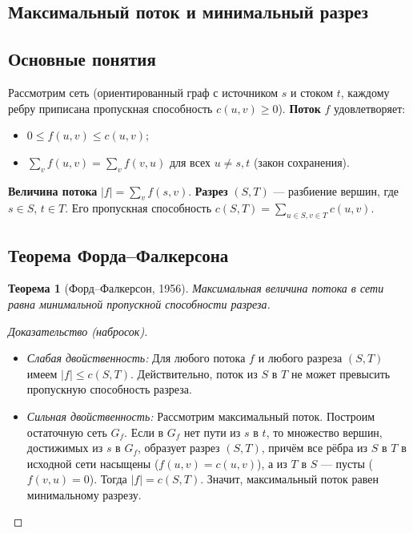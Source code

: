 \documentclass[12pt]{article}
\newtheorem{theorem}{Теорема}
\begin{document}
\begin{enumerate}
\section{Максимальный поток и минимальный разрез}
\subsection{Основные понятия}
Рассмотрим сеть (ориентированный граф с источником \(s\) и стоком \(t\), каждому ребру приписана пропускная способность \(c(u,v) \ge 0\)). \textbf{Поток} \(f\) удовлетворяет:
\begin{itemize}
    \item \(0 \le f(u,v) \le c(u,v)\);
    \item \(\sum_{v} f(u,v) = \sum_{v} f(v,u)\) для всех \(u \neq s,t\) (закон сохранения).
\end{itemize}
\textbf{Величина потока} \(|f| = \sum_{v} f(s,v)\). \textbf{Разрез} \((S,T)\) — разбиение вершин, где \(s \in S\), \(t \in T\). Его пропускная способность \(c(S,T) = \sum_{u \in S, v \in T} c(u,v)\).

\subsection{Теорема Форда–Фалкерсона}
\begin{theorem}[Форд–Фалкерсон, 1956]
    Максимальная величина потока в сети равна минимальной пропускной способности разреза.
\end{theorem}
\begin{proof}[Доказательство (набросок)]
    \begin{itemize}
        \item \textit{Слабая двойственность:} Для любого потока \(f\) и любого разреза \((S,T)\) имеем \(|f| \le c(S,T)\). Действительно, поток из \(S\) в \(T\) не может превысить пропускную способность разреза.
        \item \textit{Сильная двойственность:} Рассмотрим максимальный поток. Построим остаточную сеть \(G_f\). Если в \(G_f\) нет пути из \(s\) в \(t\), то множество вершин, достижимых из \(s\) в \(G_f\), образует разрез \((S,T)\), причём все рёбра из \(S\) в \(T\) в исходной сети насыщены (\(f(u,v)=c(u,v)\)), а из \(T\) в \(S\) — пусты (\(f(v,u)=0\)). Тогда \(|f| = c(S,T)\). Значит, максимальный поток равен минимальному разрезу.
    \end{itemize}
\end{proof}


\end{enumerate}
\end{document}
